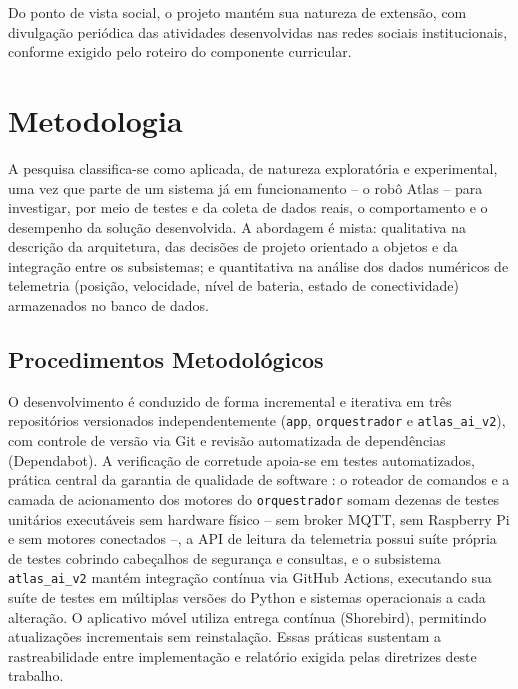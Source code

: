 Do ponto de vista social, o projeto mantém sua natureza de extensão, com divulgação periódica das atividades desenvolvidas nas redes sociais institucionais, conforme exigido pelo roteiro do componente curricular.

\section{Metodologia} \label{sec:Methodology}
A pesquisa classifica-se como aplicada, de natureza exploratória e experimental, uma vez que parte de um sistema já em funcionamento -- o robô Atlas -- para investigar, por meio de testes e da coleta de dados reais, o comportamento e o desempenho da solução desenvolvida. A abordagem é mista: qualitativa na descrição da arquitetura, das decisões de projeto orientado a objetos e da integração entre os subsistemas; e quantitativa na análise dos dados numéricos de telemetria (posição, velocidade, nível de bateria, estado de conectividade) armazenados no banco de dados.

\subsection{Procedimentos Metodológicos} \label{subsec:methodological_procedures}
O desenvolvimento é conduzido de forma incremental e iterativa \cite{prikladnicki2014} em três repositórios versionados independentemente (\texttt{app}, \texttt{orquestrador} e \texttt{atlas\_ai\_v2}), com controle de versão via Git e revisão automatizada de dependências (Dependabot). A verificação de corretude apoia-se em testes automatizados, prática central da garantia de qualidade de software \cite{sommerville2018}: o roteador de comandos e a camada de acionamento dos motores do \texttt{orquestrador} somam dezenas de testes unitários executáveis sem hardware físico -- sem broker MQTT, sem Raspberry Pi e sem motores conectados --, a API de leitura da telemetria possui suíte própria de testes cobrindo cabeçalhos de segurança e consultas, e o subsistema \texttt{atlas\_ai\_v2} mantém integração contínua via GitHub Actions, executando sua suíte de testes em múltiplas versões do Python e sistemas operacionais a cada alteração. O aplicativo móvel utiliza entrega contínua (Shorebird), permitindo atualizações incrementais sem reinstalação. Essas práticas sustentam a rastreabilidade entre implementação e relatório exigida pelas diretrizes deste trabalho.

